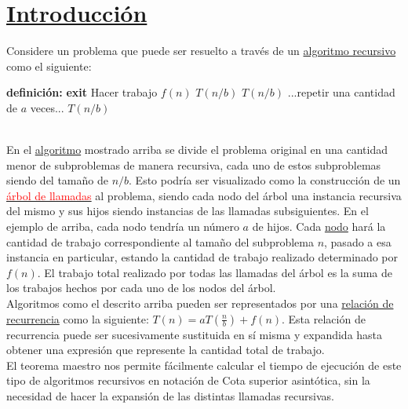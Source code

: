 \documentclass{article}
\begin{document}
	\section[Introducción]{\hyperlink{toc}{Introducción}}
	\noindent
	Considere un problema que puede ser resuelto a través de un \href{https://es.wikipedia.org/wiki/Algoritmo_recursivo}{algoritmo recursivo} como el siguiente:\\
	\begin{algorithmic}
		\textbf{definición:}
			 \textbf{exit}
			\EndIf
			\State Hacer trabajo $f(n)$
			\State $T(n/b)$
			\State $T(n/b)$
			\State ...repetir una cantidad de $a$ veces...
			\State $T(n/b)$
		\EndProcedure
	\end{algorithmic}
	\noindent
	\\
	En el \href{https://es.wikipedia.org/wiki/Algoritmo}{algoritmo} mostrado arriba se divide el problema original en una cantidad menor de subproblemas de manera recursiva, cada uno de estos subproblemas siendo del tamaño de $n/b$. Esto podría ser visualizado como la construcción de un \href{https://es.wikipedia.org/w/index.php?title=árbol_de_llamadas&action=edit&redlink=1}{\textcolor{red}{árbol de llamadas}} al problema, siendo cada nodo del árbol una instancia recursiva del mismo y sus hijos siendo instancias de las llamadas subsiguientes. En el ejemplo de arriba, cada nodo tendría un número $a$ de hijos. Cada \href{https://es.wikipedia.org/wiki/Nodo}{nodo} hará la cantidad de trabajo correspondiente al tamaño del subproblema $n$, pasado a esa instancia en particular, estando la cantidad de trabajo realizado determinado por $f(n)$. El trabajo total realizado por todas las llamadas del árbol es la suma de los trabajos hechos por cada uno de los nodos del árbol.\\
	\noindent\newline
	Algoritmos como el descrito arriba pueden ser representados por una \href{https://es.wikipedia.org/wiki/Relación_de_recurrencia}{relación de recurrencia} como la siguiente: \(T(n) = \displaystyle aT\left(\frac{n}{b}\right)+f(n)\). Esta relación de recurrencia puede ser sucesivamente sustituida en sí misma y expandida hasta obtener una expresión que represente la cantidad total de trabajo.\cite{Duke_University}\\
	\noindent\newline
	El teorema maestro nos permite fácilmente calcular el tiempo de ejecución de este tipo de algoritmos recursivos en notación de Cota superior asintótica, sin la necesidad de hacer la expansión de las distintas llamadas recursivas. 
	
\end{document}
